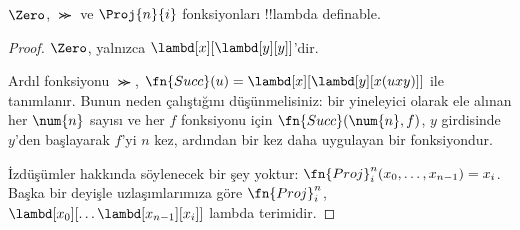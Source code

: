 \documentclass[../../../include/open-logic-section]{subfiles}
\begin{document}

\begin{lem}
$\Zero$, $\Succ$ ve $\Proj{n}{i}$ fonksiyonları !!{lambda definable}.
\end{lem}

\begin{proof}
$\Zero$, yalnızca $\lambd[x][\lambd[y][y]]$'dir.

Ardıl fonksiyonu $\Succ$, $\fn{Succ}(u)=\lambd[x][\lambd[y][x(uxy)]]$
ile tanımlanır. Bunun neden çalıştığını düşünmelisiniz: bir yineleyici olarak
ele alınan her $\num{n}$ sayısı ve her $f$ fonksiyonu için
$\fn{Succ}(\num{n},f)$, $y$ girdisinde $y$'den başlayarak $f$'yi $n$ kez,
ardından bir kez daha uygulayan bir fonksiyondur.

İzdüşümler hakkında söylenecek bir şey yoktur:
$\fn{Proj}^n_i(x_0,\dots,x_{n-1})=x_i$. Başka bir deyişle uzlaşımlarımıza
göre $\fn{Proj}^n_i$, $\lambd[x_0][\dots\lambd[x_{n-1}][x_i]]$ lambda
terimidir.
\end{proof}
\end{document}
